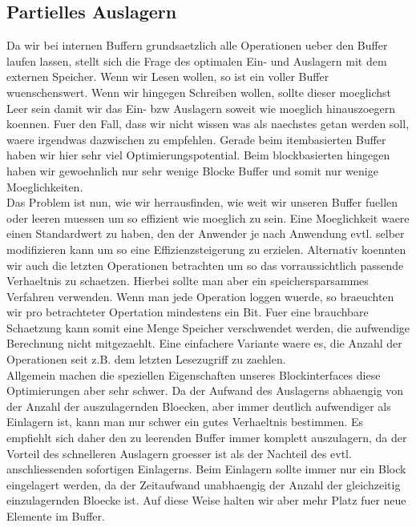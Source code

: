 \documentclass[10pt,a4paper]{article}
\begin{document}
\subsection{Partielles Auslagern}
Da wir bei internen Buffern grundsaetzlich alle Operationen ueber den Buffer laufen lassen, stellt sich die Frage des optimalen Ein- und Auslagern mit dem externen Speicher. Wenn wir Lesen wollen, so ist ein voller Buffer wuenschenswert. Wenn wir hingegen Schreiben wollen, sollte dieser moeglichst Leer sein damit wir das Ein- bzw Auslagern soweit wie moeglich hinauszoegern koennen. Fuer den Fall, dass wir nicht wissen was als naechstes getan werden soll, waere irgendwas dazwischen zu empfehlen. Gerade beim itembasierten Buffer haben wir hier sehr viel Optimierungspotential. Beim blockbasierten hingegen haben wir gewoehnlich nur sehr wenige Blocke Buffer und  somit nur wenige Moeglichkeiten.\\
Das Problem ist nun, wie wir herrausfinden, wie weit wir unseren Buffer fuellen oder leeren muessen um so effizient wie moeglich zu sein. Eine Moeglichkeit waere einen Standardwert zu haben, den der Anwender je nach Anwendung evtl. selber modifizieren kann um so eine Effizienzsteigerung zu erzielen. Alternativ koennten wir auch die letzten Operationen betrachten um so das vorraussichtlich passende Verhaeltnis zu schaetzen. Hierbei sollte man aber ein speichersparsammes Verfahren verwenden. Wenn man jede Operation loggen wuerde, so braeuchten wir pro betrachteter Opertation mindestens ein Bit. Fuer eine brauchbare Schaetzung kann somit eine Menge Speicher verschwendet werden, die aufwendige Berechnung nicht mitgezaehlt. Eine einfachere Variante waere es, die Anzahl der Operationen seit z.B. dem letzten Lesezugriff zu zaehlen. \\
Allgemein machen die speziellen Eigenschaften unseres Blockinterfaces diese Optimierungen aber sehr schwer. Da der Aufwand des Auslagerns abhaengig von der Anzahl der auszulagernden Bloecken, aber immer deutlich aufwendiger als Einlagern ist, kann man nur schwer ein gutes Verhaeltnis bestimmen. Es empfiehlt sich daher den zu leerenden Buffer immer komplett auszulagern, da der Vorteil des schnelleren Auslagern groesser ist als der Nachteil des evtl. anschliessenden sofortigen Einlagerns. Beim Einlagern sollte immer nur ein Block eingelagert werden, da der Zeitaufwand unabhaengig der Anzahl der gleichzeitig einzulagernden Bloecke ist. Auf diese Weise halten wir aber mehr Platz fuer neue Elemente im Buffer.
\end{document}
